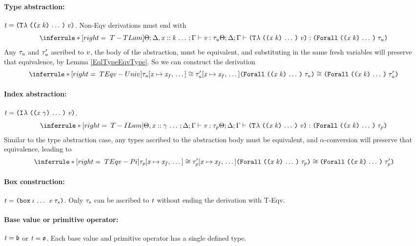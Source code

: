 \begin{sproof}
  \paragraph{Type abstraction:}
  $\term = \tlam{\sequence{\notevar{\var}{\kind}}}{\val}$.
  Non-{\sc Eqv} derivations must end with
  \[\infr[T-TLam]
  {\typeof
    {\sEnv}{\kEnv, \sequence{\haskind{\var}{\kind}}}{\tEnv}
    {\val}{\type_u}}
  {\typeof
    {\sEnv}{\kEnv}{\tEnv}
    {\tlam{\sequence{\notevar{\var}{\kind}}}{\val}}
    {\typeuniv{\sequence{\notevar{\var}{\kind}}}{\type_u}}}\]
  Any $\mathit{\tau}_u$ and $\mathit{\tau}_u'$ ascribed to $\mathit{v}$, the body of the abstraction,
  must be equivalent,
  and substituting in the same fresh variables
  will preserve that equivalence,
  by Lemma \ref{EqlTypeEqvType}.
  So we can construct the derivation
  \[\infr[TEqv-Univ]
  {\teqv
    {\seqsubst{\type_u}{\var}{\var_f}}
    {\seqsubst{\type_u'}{\var}{\var_f}}}
  {\teqv
    {\typeuniv{\sequence{\notevar{\var}{\kind}}}{\type_u}}
    {\typeuniv{\sequence{\notevar{\var}{\kind}}}{\type_u'}}}\]
  \paragraph{Index abstraction:}
  $\term = \ilam{\sequence{\notevar{\var}{\sort}}}{\val}$.
  \[\infr[T-ILam]
  {\typeof
    {\sEnv, \sequence{\hassort{\var}{\sort}}}{\kEnv}{\tEnv}
    {\val}{\type_p}}
  {\typeof
    {\sEnv}{\kEnv}{\tEnv}
    {\tlam{\sequence{\notevar{\var}{\kind}}}{\val}}
    {\typeuniv{\sequence{\notevar{\var}{\kind}}}{\type_p}}}\]
  Similar to the type abstraction case,
  any types ascribed to the abstraction body must be equivalent,
  and $\alpha$-conversion will preserve that equivalence,
  leading to
  \[\infr[TEqv-Pi]
  {\teqv
    {\seqsubst{\type_p}{\var}{\var_f}}
    {\seqsubst{\type_p'}{\var}{\var_f}}}
  {\teqv
    {\typeuniv{\sequence{\notevar{\var}{\kind}}}{\type_p}}
    {\typeuniv{\sequence{\notevar{\var}{\kind}}}{\type_p'}}}\]
  \paragraph{Box construction:}
  $\term = \dsum{\sequence{\idx}}{\expr}{\type_s}$.
  Only $\mathit{\tau}_s$ can be ascribed to $\mathit{t}$ without ending the derivation with {\sc T-Eqv}.
  \paragraph{Base value or primitive operator:}
  $\mathit{t} = \mathfrak{b}$ or $\mathit{t} = \mathfrak{o}$.
  Each base value and primitive operator has a single defined type.
\end{sproof}

